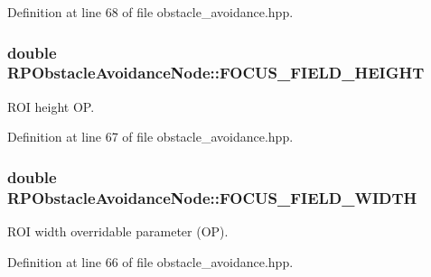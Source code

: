\-Definition at line 68 of file obstacle\-\_\-avoidance.\-hpp.

\hypertarget{class_r_p_obstacle_avoidance_node_ada49702c116a61ccc237d19349805c82}{
\subsubsection[{\-F\-O\-C\-U\-S\-\_\-\-F\-I\-E\-L\-D\-\_\-\-H\-E\-I\-G\-H\-T}]{\setlength{\rightskip}{0pt plus 5cm}double {\bf \-R\-P\-Obstacle\-Avoidance\-Node\-::\-F\-O\-C\-U\-S\-\_\-\-F\-I\-E\-L\-D\-\_\-\-H\-E\-I\-G\-H\-T}}}\label{class_r_p_obstacle_avoidance_node_ada49702c116a61ccc237d19349805c82}
\-R\-O\-I height \-O\-P. 

\-Definition at line 67 of file obstacle\-\_\-avoidance.\-hpp.

\hypertarget{class_r_p_obstacle_avoidance_node_ad2fd3ecf37f7cb251a5beaf9f5bb44b8}{
\subsubsection[{\-F\-O\-C\-U\-S\-\_\-\-F\-I\-E\-L\-D\-\_\-\-W\-I\-D\-T\-H}]{\setlength{\rightskip}{0pt plus 5cm}double {\bf \-R\-P\-Obstacle\-Avoidance\-Node\-::\-F\-O\-C\-U\-S\-\_\-\-F\-I\-E\-L\-D\-\_\-\-W\-I\-D\-T\-H}}}\label{class_r_p_obstacle_avoidance_node_ad2fd3ecf37f7cb251a5beaf9f5bb44b8}
\-R\-O\-I width overridable parameter (\-O\-P). 

\-Definition at line 66 of file obstacle\-\_\-avoidance.\-hpp.

